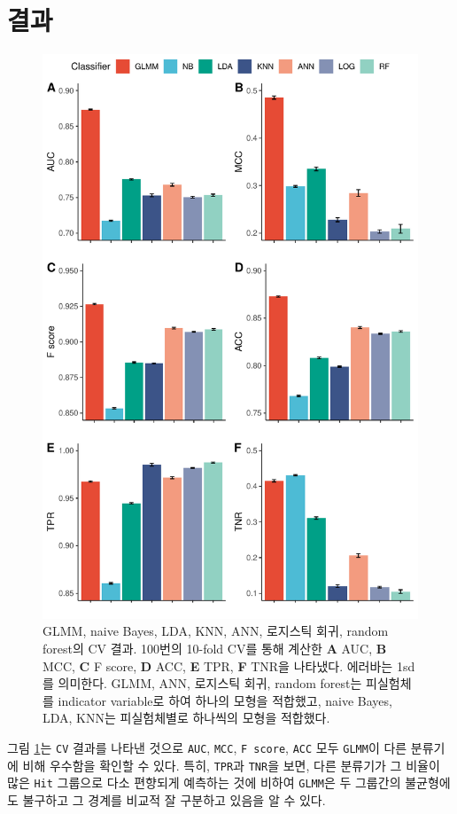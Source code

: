 \documentclass[11pt,onecolumn,twoside,a4size]{gsag3jnl}
\begin{document}
\section{결과}

\begin{figure}[tp]
  \renewcommand{\familydefault}{\sfdefault}\normalfont
  \centering
  \includegraphics[width=0.7\linewidth]{Rplot.pdf}
  \caption{\small GLMM, naive Bayes, LDA, KNN, ANN, 로지스틱 회귀, random forest의 CV 결과. 100번의 10-fold CV를 통해 계산한 \textbf{A} AUC, \textbf{B} MCC, \textbf{C} F score, \textbf{D} ACC, \textbf{E} TPR, \textbf{F} TNR을 나타냈다. 에러바는 1sd를 의미한다. GLMM, ANN, 로지스틱 회귀, random forest는 피실험체를 indicator variable로 하여 하나의 모형을 적합했고, naive Bayes, LDA, KNN는 피실험체별로 하나씩의 모형을 적합했다.}
  \label{fig:cv}
\end{figure}

그림 \ref{fig:cv}는 \texttt{CV} 결과를 나타낸 것으로 \texttt{AUC}, \texttt{MCC}, \texttt{F score}, \texttt{ACC} 모두 \texttt{GLMM}이 다른 분류기에 비해 우수함을 확인할 수 있다. 특히, \texttt{TPR}과 \texttt{TNR}을 보면, 다른 분류기가 그 비율이 많은 \texttt{Hit} 그룹으로 다소 편향되게 예측하는 것에 비하여 \texttt{GLMM}은 두 그룹간의 불균형에도 불구하고 그 경계를 비교적 잘 구분하고 있음을 알 수 있다.
\end{document}

